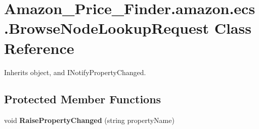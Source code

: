 \hypertarget{class_amazon___price___finder_1_1amazon_1_1ecs_1_1_browse_node_lookup_request}{\section{Amazon\-\_\-\-Price\-\_\-\-Finder.\-amazon.\-ecs.\-Browse\-Node\-Lookup\-Request Class Reference}
\label{class_amazon___price___finder_1_1amazon_1_1ecs_1_1_browse_node_lookup_request}
}


 




Inherits object, and I\-Notify\-Property\-Changed.

\subsection*{Protected Member Functions}
\begin{DoxyCompactItemize}
\item 
\hypertarget{class_amazon___price___finder_1_1amazon_1_1ecs_1_1_browse_node_lookup_request_ab99f5ea6ae18d78407178f4b4f36c2e9}{void {\bfseries Raise\-Property\-Changed} (string property\-Name)}\label{class_amazon___price___finder_1_1amazon_1_1ecs_1_1_browse_node_lookup_request_ab99f5ea6ae18d78407178f4b4f36c2e9}

\end{DoxyCompactItemize}
